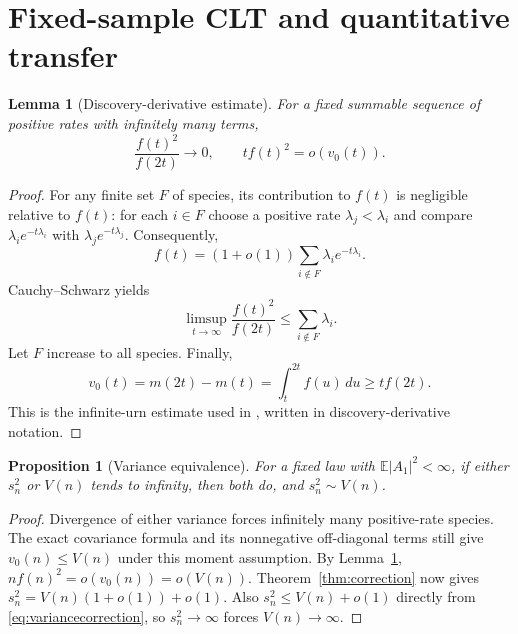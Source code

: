 \documentclass[11pt]{article}
\numberwithin{equation}{section}
\newtheorem{lemma}[theorem]{Lemma}
\newtheorem{proposition}[theorem]{Proposition}
\theoremstyle{definition}
\theoremstyle{remark}
\newcommand{\E}{\mathbb E}
\begin{document}
\section{Fixed-sample CLT and quantitative transfer}\label{sec:depois}

\begin{lemma}[Discovery-derivative estimate]\label{lem:flux}
For a fixed summable sequence of positive rates with infinitely many terms,
\begin{equation}\label{eq:fluxratio}
 \frac{f(t)^2}{f(2t)}\longrightarrow0,
 \qquad tf(t)^2=o(v_0(t)).
\end{equation}
\end{lemma}
\begin{proof}
For any finite set $F$ of species, its contribution to $f(t)$ is negligible
relative to $f(t)$: for each $i\in F$ choose a positive rate $\lambda_j<\lambda_i$
and compare $\lambda_i e^{-t\lambda_i}$ with
$\lambda_j e^{-t\lambda_j}$. Consequently,
\[
 f(t)=(1+o(1))\sum_{i\notin F}\lambda_i e^{-t\lambda_i}.
\]
Cauchy--Schwarz yields
\[
 \limsup_{t\to\infty}\frac{f(t)^2}{f(2t)}
 \le\sum_{i\notin F}\lambda_i.
\]
Let $F$ increase to all species. Finally,
\[
 v_0(t)=m(2t)-m(t)=\int_t^{2t}f(u)\,du\ge tf(2t).
\]
This is the infinite-urn estimate used in
\cite{Dutko,ErikssonGraphs}, written in discovery-derivative notation.
\end{proof}

\begin{proposition}[Variance equivalence]\label{prop:variance-equivalence}
For a fixed law with $\E|A_1|^2<\infty$, if either $s_n^2$ or $V(n)$ tends to infinity,
then both do, and $s_n^2\sim V(n)$.
\end{proposition}
\begin{proof}
Divergence of either variance forces infinitely many positive-rate species.
The exact covariance formula and its nonnegative off-diagonal terms still
give $v_0(n)\le V(n)$ under this moment assumption. By Lemma~\ref{lem:flux},
$nf(n)^2=o(v_0(n))=o(V(n))$. Theorem~\ref{thm:correction} now gives
$s_n^2=V(n)(1+o(1))+o(1)$. Also $s_n^2\le V(n)+o(1)$ directly from
\eqref{eq:variancecorrection}, so $s_n^2\to\infty$ forces $V(n)\to\infty$.
\end{proof}
\end{document}
